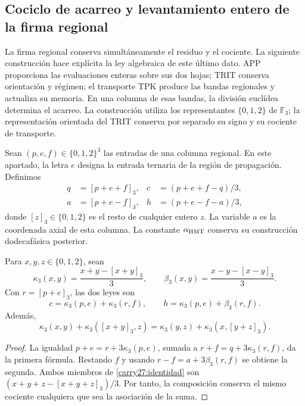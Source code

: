\subsection{Cociclo de acarreo y levantamiento entero de la firma regional}
\label{carry27:seccion}

La firma regional conserva simultáneamente el residuo y el cociente.
La siguiente construcción hace explícita la ley algebraica de este
último dato. APP proporciona las evaluaciones enteras sobre sus dos
hojas; TRIT conserva orientación y régimen; el transporte TPK
produce las bandas regionales y actualiza su memoria. En una
columna de esas bandas, la división euclídea determina el acarreo.
La construcción utiliza los representantes \(\{0,1,2\}\) de
\(\mathbb F_3\); la representación orientada del TRIT conserva
por separado su signo y su cociente de transporte.

Sean \((p,e,f)\in\{0,1,2\}^3\) las entradas de una columna
regional. En este apartado, la letra \(e\) designa la entrada
ternaria de la región de propagación. Definimos
\begin{equation}
\begin{aligned}
q&=[p+e+f]_3,& c&=(p+e+f-q)/3,\\
a&=[p+e-f]_3,& h&=(p+e-f-a)/3,
\end{aligned}
\label{carry27:division}
\end{equation}
donde \([z]_3\in\{0,1,2\}\) es el resto de cualquier entero \(z\).
La variable \(a\) es la coordenada axial de esta columna. La
constante \(\alpha_{\rm HMT}\) conserva su construcción
dodecafásica posterior.

\begin{proposition}
\label{carry27:cociclo}
Para \(x,y,z\in\{0,1,2\}\), sean
\[
\kappa_3(x,y)=\frac{x+y-[x+y]_3}{3},\qquad
\beta_3(x,y)=\frac{x-y-[x-y]_3}{3}.
\]
Con \(r=[p+e]_3\), las dos leyes son
\[
c=\kappa_3(p,e)+\kappa_3(r,f),\qquad
h=\kappa_3(p,e)+\beta_3(r,f).
\]
Además,
\begin{equation}
\kappa_3(x,y)+\kappa_3([x+y]_3,z)
=\kappa_3(y,z)+\kappa_3(x,[y+z]_3).
\label{carry27:identidad}
\end{equation}
\end{proposition}

\begin{proof}
La igualdad \(p+e=r+3\kappa_3(p,e)\), sumada a
\(r+f=q+3\kappa_3(r,f)\), da la primera fórmula.
Restando \(f\) y usando
\(r-f=a+3\beta_3(r,f)\) se obtiene la segunda.
Ambos miembros de \eqref{carry27:identidad} son
\((x+y+z-[x+y+z]_3)/3\). Por tanto, la composición
conserva el mismo cociente cualquiera que sea la asociación
de la suma.
\end{proof}

